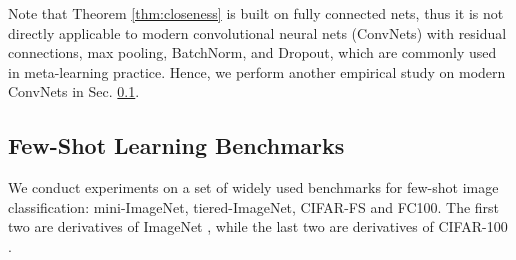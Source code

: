\documentclass{article}
\begin{document}
Note that Theorem \ref{thm:closeness} is built on fully connected nets, thus it is not directly applicable to modern convolutional neural nets (ConvNets) with residual connections, max pooling, BatchNorm, and Dropout, which are commonly used in meta-learning practice. Hence, we perform another empirical study on modern ConvNets in Sec. \ref{sec:exp:few-shot}.
\vspace{-.7em}
\subsection{Few-Shot Learning Benchmarks}\label{sec:exp:few-shot}
We conduct experiments on a set of widely used benchmarks for few-shot image classification: mini-ImageNet, tiered-ImageNet, CIFAR-FS and FC100. The first two are derivatives of ImageNet \cite{imagenet}, while the last two are derivatives of CIFAR-100 \cite{cifar}.
\end{document}
